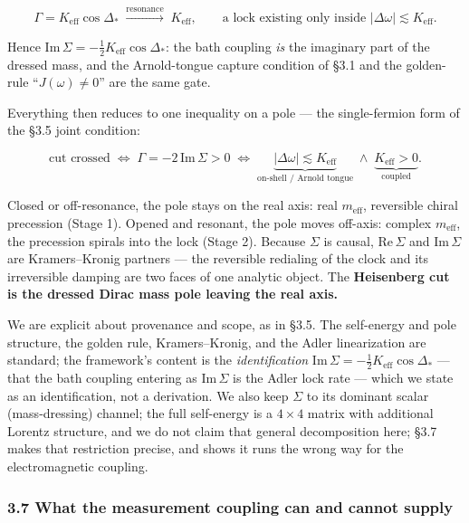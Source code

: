 \documentclass[
]{article}
\begin{document}
\[\Gamma = K_{\text{eff}}\cos\Delta_* \;\xrightarrow{\text{resonance}}\; K_{\text{eff}}, \qquad \text{a lock existing only inside } |\Delta\omega|\lesssim K_{\text{eff}}.\]

Hence \(\mathrm{Im}\,\Sigma = -\tfrac12 K_{\text{eff}}\cos\Delta_*\):
the bath coupling \emph{is} the imaginary part of the dressed mass, and
the Arnold-tongue capture condition of §3.1 and the golden-rule
``\(J(\omega)\neq 0\)'' are the same gate.

Everything then reduces to one inequality on a pole --- the
single-fermion form of the §3.5 joint condition:

\[\text{cut crossed} \;\Longleftrightarrow\; \Gamma = -2\,\mathrm{Im}\,\Sigma > 0 \;\Longleftrightarrow\; \underbrace{|\Delta\omega| \lesssim K_{\text{eff}}}_{\text{on-shell / Arnold tongue}} \;\wedge\; \underbrace{K_{\text{eff}} > 0}_{\text{coupled}}.\]

Closed or off-resonance, the pole stays on the real axis: real
\(m_{\text{eff}}\), reversible chiral precession (Stage 1). Opened and
resonant, the pole moves off-axis: complex \(m_{\text{eff}}\), the
precession spirals into the lock (Stage 2). Because \(\Sigma\) is
causal, \(\mathrm{Re}\,\Sigma\) and \(\mathrm{Im}\,\Sigma\) are
Kramers--Kronig partners --- the reversible redialing of the clock and
its irreversible damping are two faces of one analytic object. The
\textbf{Heisenberg cut is the dressed Dirac mass pole leaving the real
axis.}

We are explicit about provenance and scope, as in §3.5. The self-energy
and pole structure, the golden rule, Kramers--Kronig, and the Adler
linearization are standard; the framework's content is the
\emph{identification}
\(\mathrm{Im}\,\Sigma = -\tfrac12 K_{\text{eff}}\cos\Delta_*\) --- that
the bath coupling entering as \(\mathrm{Im}\,\Sigma\) is the Adler lock
rate --- which we state as an identification, not a derivation. We also
keep \(\Sigma\) to its dominant scalar (mass-dressing) channel; the full
self-energy is a \(4\times4\) matrix with additional Lorentz structure,
and we do not claim that general decomposition here; §3.7 makes that
restriction precise, and shows it runs the wrong way for the
electromagnetic coupling.

\subsubsection{3.7 What the measurement coupling can and cannot
supply}\label{what-the-measurement-coupling-can-and-cannot-supply}
\end{document}

